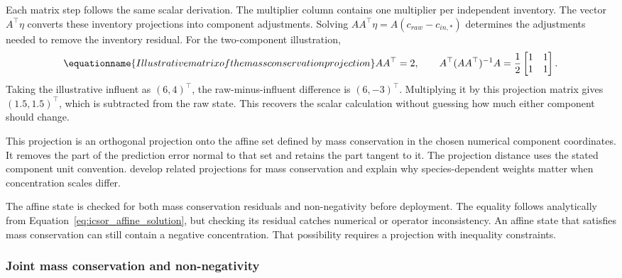 Each matrix step follows the same scalar derivation. The multiplier column contains one multiplier per independent inventory. The vector \(A^\top\eta\) converts these inventory projections into component adjustments. Solving \(AA^\top\eta=A(c_{raw}-c_{in,*})\) determines the adjustments needed to remove the inventory residual. For the two-component illustration,
\begin{equation}
\equationname{Illustrative matrix of the mass conservation projection}
\label{eq:icsor_small_affine_matrix}
AA^\top=2,
\qquad
A^\top(AA^\top)^{-1}A
=\frac{1}{2}\begin{bmatrix}1&1\\1&1\end{bmatrix}.
\end{equation}
Taking the illustrative influent as \((6,4)^\top\), the raw-minus-influent difference is \((6,-3)^\top\). Multiplying it by this projection matrix gives \((1.5,1.5)^\top\), which is subtracted from the raw state. This recovers the scalar calculation without guessing how much either component should change.

This projection is an orthogonal projection onto the affine set defined by mass conservation in the chosen numerical component coordinates. It removes the part of the prediction error normal to that set and retains the part tangent to it. The projection distance uses the stated component unit convention. \citet{SturmSilva2024} develop related projections for mass conservation and explain why species-dependent weights matter when concentration scales differ.

The affine state is checked for both mass conservation residuals and non-negativity before deployment. The equality follows analytically from Equation~\eqref{eq:icsor_affine_solution}, but checking its residual catches numerical or operator inconsistency. An affine state that satisfies mass conservation can still contain a negative concentration. That possibility requires a projection with inequality constraints.

\subsubsection{Joint mass conservation and non-negativity}

